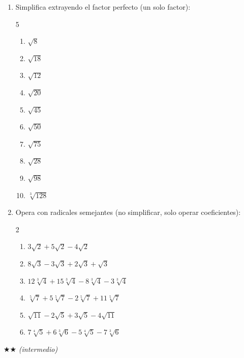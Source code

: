 \documentclass[11pt, letterpaper]{article}
\begin{document}
\begin{enumerate}[label=\textbf{\arabic*.}, leftmargin=*]
  \item Simplifica extrayendo el factor perfecto (un solo factor):
  \begin{multicols}{5}
  \begin{enumerate}[label=\alph*)]
    \item $\sqrt{8}$
    \item $\sqrt{18}$
    \item $\sqrt{12}$
    \item $\sqrt{20}$
    \item $\sqrt{45}$
    \item $\sqrt{50}$
    \item $\sqrt{75}$
    \item $\sqrt{28}$
    \item $\sqrt{98}$
    \item $\sqrt[3]{128}$
  \end{enumerate}
  \end{multicols}

  \item Opera con radicales semejantes (no simplificar, solo operar coeficientes):
  \begin{multicols}{2}
  \begin{enumerate}[label=\alph*)]
    \item $3\sqrt{2}+5\sqrt{2}-4\sqrt{2}$
    \item $8\sqrt{3}-3\sqrt{3}+2\sqrt{3}+\sqrt{3}$
    \item $12\sqrt[3]{4}+15\sqrt[3]{4}-8\sqrt[3]{4}-3\sqrt[3]{4}$
    \item $\sqrt[5]{7}+5\sqrt[5]{7}-2\sqrt[5]{7}+11\sqrt[5]{7}$
    \item $\sqrt{11}-2\sqrt{5}+3\sqrt{5}-4\sqrt{11}$
    \item $7\sqrt[4]{5}+6\sqrt[3]{6}-5\sqrt[4]{5}-7\sqrt[3]{6}$
  \end{enumerate}
  \end{multicols}
\end{enumerate}

$\bigstar\bigstar$ \textit{(intermedio)}
\end{document}
